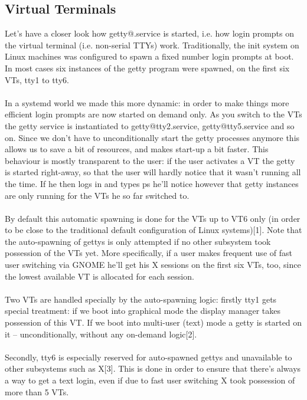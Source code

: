 \documentclass[titlepage]{article}
\begin{document}
\subsection{Virtual Terminals}
Let's have a closer look how getty@.service is started, i.e. how login prompts on the virtual terminal (i.e. non-serial TTYs) work. Traditionally, the init system on Linux machines was configured to spawn a fixed number login prompts at boot. In most cases six instances of the getty program were spawned, on the first six VTs, tty1 to tty6.
\\
\\
In a systemd world we made this more dynamic: in order to make things more efficient login prompts are now started on demand only. As you switch to the VTs the getty service is instantiated to getty@tty2.service, getty@tty5.service and so on. Since we don't have to unconditionally start the getty processes anymore this allows us to save a bit of resources, and makes start-up a bit faster. This behaviour is mostly transparent to the user: if the user activates a VT the getty is started right-away, so that the user will hardly notice that it wasn't running all the time. If he then logs in and types ps he'll notice however that getty instances are only running for the VTs he so far switched to.
\\
\\
By default this automatic spawning is done for the VTs up to VT6 only (in order to be close to the traditional default configuration of Linux systems)[1]. Note that the auto-spawning of gettys is only attempted if no other subsystem took possession of the VTs yet. More specifically, if a user makes frequent use of fast user switching via GNOME he'll get his X sessions on the first six VTs, too, since the lowest available VT is allocated for each session.
\\
\\
Two VTs are handled specially by the auto-spawning logic: firstly tty1 gets special treatment: if we boot into graphical mode the display manager takes possession of this VT. If we boot into multi-user (text) mode a getty is started on it -- unconditionally, without any on-demand logic[2].
\\
\\
Secondly, tty6 is especially reserved for auto-spawned gettys and unavailable to other subsystems such as X[3]. This is done in order to ensure that there's always a way to get a text login, even if due to fast user switching X took possession of more than 5 VTs.
\end{document}

